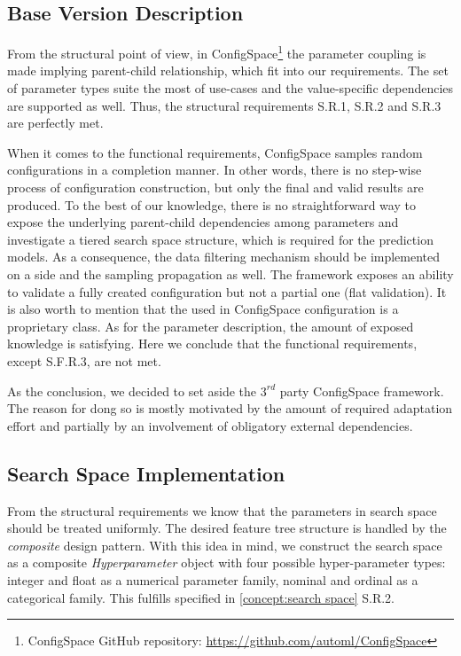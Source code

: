 \subsection{Base Version Description}
From the structural point of view, in ConfigSpace\footnote{ConfigSpace GitHub repository: \url{https://github.com/automl/ConfigSpace}} the parameter coupling is made implying parent-child relationship, which fit into our requirements. The set of parameter types suite the most of use-cases and the value-specific dependencies are supported as well. Thus, the structural requirements S.R.1, S.R.2 and S.R.3 are perfectly met.

When it comes to the functional requirements, ConfigSpace samples random configurations in a completion manner. In other words, there is no step-wise process of configuration construction, but only the final and valid results are produced. To the best of our knowledge, there is no straightforward way to expose the underlying parent-child dependencies among parameters and investigate a tiered search space structure, which is required for the prediction models. As a consequence, the data filtering mechanism should be implemented on a side and the sampling propagation as well. The framework exposes an ability to validate a fully created configuration but not a partial one (flat validation). It is also worth to mention that the used in ConfigSpace configuration is a proprietary class. As for the parameter description, the amount of exposed knowledge is satisfying. Here we conclude that the functional requirements, except S.F.R.3, are not met.

As the conclusion, we decided to set aside the $3^{rd}$ party ConfigSpace framework. The reason for dong so is mostly motivated by the amount of required adaptation effort and partially by an involvement of obligatory external dependencies.


\subsection{Search Space Implementation}\label{impl: search space impl}
From the structural requirements we know that the parameters in search space should be treated uniformly. The desired feature tree structure is handled by the \emph{composite} design pattern. With this idea in mind, we construct the search space as a composite \emph{Hyperparameter} object with four possible hyper-parameter types: integer and float as a numerical parameter family, nominal and ordinal as a categorical family. This fulfills specified in \cref{concept:search space} S.R.2.

